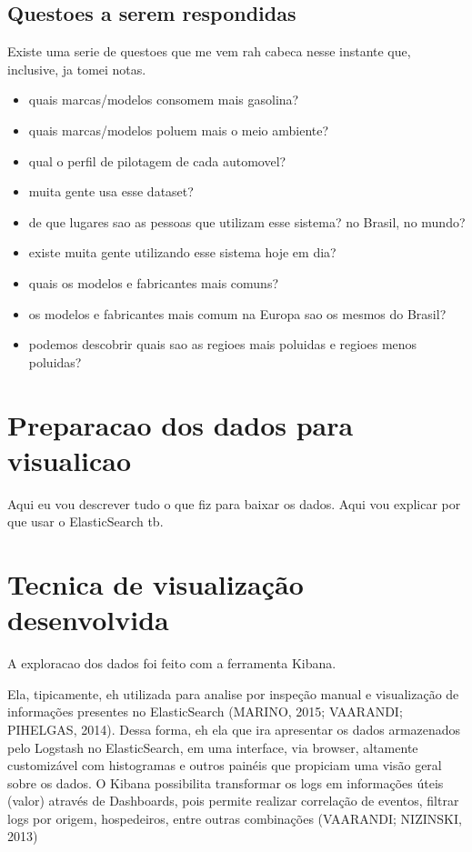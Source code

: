 \documentclass[10pt, conference]{IEEEtran}
\begin{document}
\begin{itemize}
\begin{itemize}
  \end{itemize}    

\end{itemize}




\subsection{Questoes a serem respondidas}
Existe uma serie de questoes que me vem rah cabeca nesse instante que,
inclusive, ja tomei notas.

\begin{itemize}
  \item quais marcas/modelos consomem mais gasolina?
  \item quais marcas/modelos poluem mais o meio ambiente?
  \item qual o perfil de pilotagem de cada automovel?
  \item muita gente usa esse dataset?
  \item de que lugares sao as pessoas que utilizam esse sistema? no Brasil, no mundo?
  \item existe muita gente utilizando esse sistema hoje em dia?
  \item quais os modelos e fabricantes mais comuns?
  \item os modelos e fabricantes mais comum na Europa sao os mesmos do Brasil?
  \item podemos descobrir quais sao as regioes mais poluidas e regioes menos poluidas?
\end{itemize}




\section{Preparacao dos dados para visualicao}
Aqui eu vou descrever tudo o que fiz para baixar os dados.
Aqui vou explicar por que usar o ElasticSearch tb.



\section{Tecnica de visualização desenvolvida}
\label{sec:technique}
%
A exploracao dos dados foi feito com a ferramenta Kibana. 

Ela, tipicamente, 
eh utilizada para analise por inspeção manual e visualização de informações presentes no
ElasticSearch (MARINO,  2015;  VAARANDI;  PIHELGAS,  2014).   Dessa  forma,  eh  ela  que
ira apresentar os dados armazenados pelo Logstash no ElasticSearch, em uma interface,  via
browser, altamente customizável com histogramas e outros painéis que propiciam uma visão
geral sobre os dados.  O Kibana possibilita transformar os logs em informações úteis (valor)
através  de Dashboards,  pois  permite  realizar  correlação  de  eventos,  filtrar logs
por  origem, hospedeiros, entre outras combinações (VAARANDI; NIZINSKI, 2013)
\end{document}
